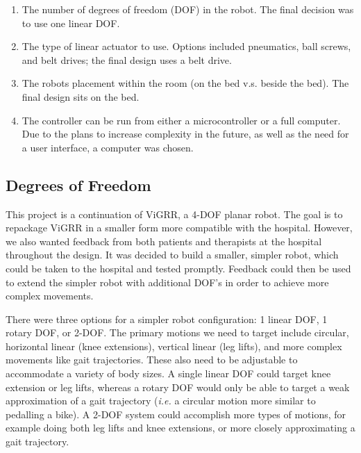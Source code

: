 \documentclass[12pt]{report}
\begin{document}
	\begin{enumerate}
		\item The number of degrees of freedom (DOF) in the robot. The final decision was to use one linear DOF.
		\item The type of linear actuator to use. Options included pneumatics, ball screws, and belt drives; the final design uses a belt drive.
		\item The robots placement within the room (on the bed v.s. beside the bed). The final design sits on the bed.
		\item The controller can be run from either a microcontroller or a full computer. Due to the plans to increase complexity in the future, as well as the need for a user interface, a computer was chosen. 
	\end{enumerate}
	
	
		\subsection{Degrees of Freedom}
		
		This project is a continuation of ViGRR, a 4-DOF planar robot. The goal is to repackage ViGRR in a smaller form more compatible with the hospital. However, we also wanted feedback from both patients and therapists at the hospital throughout the design. It was decided to build a smaller, simpler robot, which could be taken to the hospital and tested promptly. Feedback could then be used to extend the simpler robot with additional DOF's in order to achieve more complex movements.
		
		There were three options for a simpler robot configuration: 1 linear DOF, 1 rotary DOF, or 2-DOF. The primary motions we need to target include circular, horizontal linear (knee extensions), vertical linear (leg lifts), and more complex movements like gait trajectories. These also need to be adjustable to accommodate a variety of body sizes. A single linear DOF could target knee extension or leg lifts, whereas a rotary DOF would only be able to target a weak approximation of a gait trajectory (\textit{i.e.} a circular motion more similar to pedalling a bike). A 2-DOF system could accomplish more types of motions, for example doing both leg lifts and knee extensions, or more closely approximating a gait trajectory.
		
\end{document}
